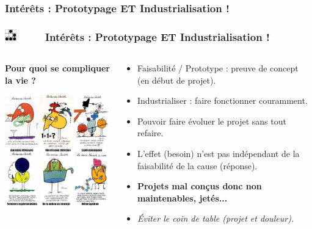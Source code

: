 \documentclass[slidetop,11pt]{beamer}
\def\sectionPartIdTR{Int{\'e}r{\^e}ts : Prototypage ET Industrialisation !}
\def\moreInFrameTitle{\includegraphics[height=0.5cm]{img/logo_glider.png}~~~~~}
\begin{document}
\subsubsection{\sectionPartIdTR}
\begin{frame}
	\frametitle{\moreInFrameTitle \sectionPartIdTR}
	\begin{columns}[T]
	\begin{column}[T]{7cm}
		\begin{footnotesize} \textbf{Pour quoi se compliquer la vie ?} \end{footnotesize}
		\includegraphics[width=7cm]{img/shadoks_devises.png}~\\
	\end{column}
	\begin{column}[T]{5.5cm}
		\begin{itemize}
			\item Faisabilit{\'e} / Prototype : preuve de concept (en d{\'e}but de projet). 
			\item Industrialiser : faire fonctionner couramment. 
			\item Pouvoir faire {\'e}voluer le projet sans tout refaire. 
			\item L'effet (besoin) n'est pas ind{\'e}pendant de la faisabilit{\'e} de la cause (r{\'e}ponse). 
			\item \textbf{Projets mal con\c{c}us donc non maintenables, jet{\'e}s...}
			\item \emph{{\'E}viter le coin de table (projet et douleur). }
		\end{itemize}
	\end{column}
	\end{columns}~\\
\end{frame} 
\end{document}
